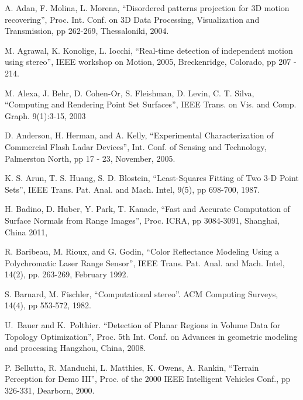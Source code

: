 \documentclass[twocolumn,oneside]{book}
\begin{document}

\begin{thebibliography}{99}

A. Adan, F. Molina, L. Morena, 
``Disordered patterns projection for 3D motion recovering'',
Proc. Int. Conf. on 
3D Data Processing, Visualization and Transmission, pp 262-269, Thessaloniki, 2004.

M. Agrawal, K. Konolige, L. Iocchi,
``Real-time detection of independent motion using stereo'', 
IEEE workshop on Motion, 2005, Breckenridge, Colorado, pp 207 - 214.

M. Alexa, J. Behr, D. Cohen-Or, S. Fleishman, D. Levin,  C. T. Silva,
``Computing and Rendering Point Set Surfaces'',
IEEE Trans. on Vis. and Comp. Graph. 9(1):3-15, 2003

D. Anderson, H. Herman, and A. Kelly,
``Experimental Characterization of Commercial Flash Ladar Devices'',
Int. Conf. of Sensing and Technology, Palmerston North, pp 17 - 23, November, 2005. 

K. S. Arun, T. S. Huang, S. D. Blostein,
``Least-Squares Fitting of Two 3-D Point Sets'', 
IEEE Trans. Pat. Anal. and Mach. Intel, 9(5), pp 698-700, 1987.


H. Badino, D. Huber, Y. Park, T. Kanade,
``Fast and Accurate Computation of Surface Normals from Range Images'',
Proc. ICRA, pp 3084-3091, Shanghai, China 2011,

R. Baribeau, M. Rioux, and G. Godin, 
``Color Reflectance Modeling Using a Polychromatic Laser Range Sensor'',
IEEE Trans. Pat. Anal. and Mach. Intel, 14(2), pp. 263-269, February 1992.

S. Barnard, M. Fischler,
``Computational stereo''.
ACM Computing Surveys, 14(4), pp 553-572, 1982.

U.~Bauer and K.~Polthier.
``Detection of Planar Regions in Volume Data for Topology Optimization'',
Proc. 5th Int. Conf. on Advances in geometric modeling and processing
Hangzhou, China, 2008.

P. Bellutta, R. Manduchi, L. Matthies, K. Owens, A. Rankin, 
``Terrain Perception for Demo III'', 
Proc. of the 2000 IEEE Intelligent Vehicles Conf., pp 326-331, Dearborn, 2000.


\end{thebibliography}
\end{document}
